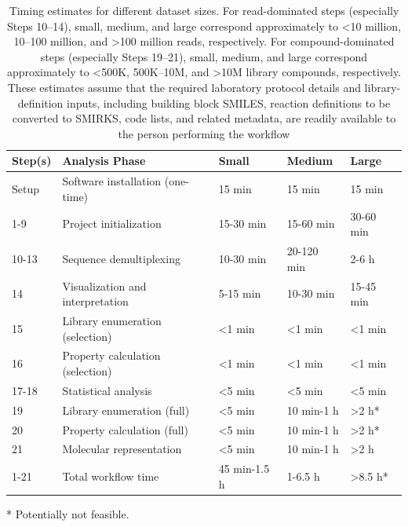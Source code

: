 \begin{table}[htbp]
\centering
\caption{Timing estimates for different dataset sizes. For read-dominated steps (especially Steps 10--14), small, medium, and large correspond approximately to \textless{}10 million, 10--100 million, and \textgreater{}100 million reads, respectively. For compound-dominated steps (especially Steps 19--21), small, medium, and large correspond approximately to \textless{}500K, 500K--10M, and \textgreater{}10M library compounds, respectively. These estimates assume that the required laboratory protocol details and library-definition inputs, including building block SMILES, reaction definitions to be converted to SMIRKS, code lists, and related metadata, are readily available to the person performing the workflow}
\label{tab:table14}
\begin{tabular}{p{1.7cm}p{4.4cm}p{2.0cm}p{2.0cm}p{2.0cm}}
\toprule
Step(s) & Analysis Phase & Small & Medium & Large \\
\midrule
Setup & Software installation (one-time) & 15 min & 15 min & 15 min \\
1-9 & Project initialization & 15-30 min & 15-60 min & 30-60 min \\
10-13 & Sequence demultiplexing & 10-30 min & 20-120 min & 2-6 h \\
14 & Visualization and interpretation & 5-15 min & 10-30 min & 15-45 min \\
15 & Library enumeration (selection) & \textless{}1 min & \textless{}1 min & \textless{}1 min \\
16 & Property calculation (selection) & \textless{}1 min & \textless{}1 min & \textless{}1 min \\
17-18 & Statistical analysis & \textless{}5 min & \textless{}5 min & \textless{}5 min \\
19 & Library enumeration (full) & \textless{}5 min & 10 min-1 h & \textgreater{}2 h* \\
20 & Property calculation (full) & \textless{}5 min & 10 min-1 h & \textgreater{}2 h* \\
21 & Molecular representation & \textless{}5 min & 10 min-1 h & \textgreater{}2 h \\
1-21 & Total workflow time & 45 min-1.5 h & 1-6.5 h & \textgreater{}8.5 h* \\
\bottomrule
\end{tabular}
\par\smallskip
\begin{minipage}{\textwidth}
\footnotesize
* Potentially not feasible.
\end{minipage}
\end{table}

